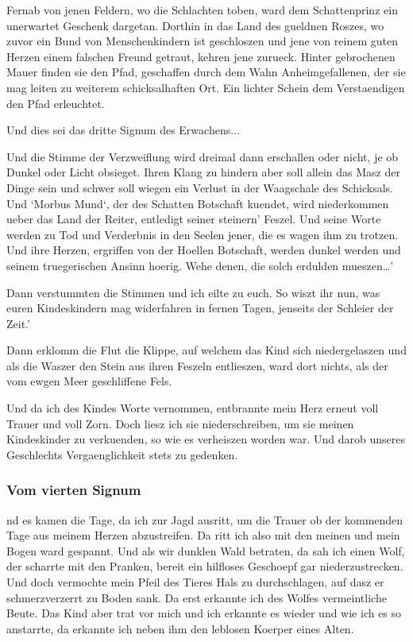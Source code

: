 \documentclass[a5paper,8pt]{book}
\begin{document}
Fernab von jenen Feldern, wo die Schlachten toben, ward dem Schattenprinz ein unerwartet Geschenk dargetan. Dorthin in das Land des gueldnen Roszes, wo zuvor ein Bund von Menschenkindern ist geschloszen und jene von reinem guten Herzen einem falschen Freund getraut, kehren jene zurueck. Hinter gebrochenen Mauer finden sie den Pfad, geschaffen durch dem Wahn Anheimgefallenen, der sie mag leiten zu weiterem schicksalhaften Ort. Ein lichter Schein dem Verstaendigen den Pfad erleuchtet.

Und dies sei das dritte Signum des Erwachens...

Und die Stimme der Verzweiflung wird dreimal dann erschallen oder nicht, je ob Dunkel oder Licht obsieget. Ihren Klang zu hindern aber soll allein das Masz der Dinge sein und schwer soll wiegen ein Verlust in der Waagschale des Schicksals.
Und ‘Morbus Mund‘, der des Schatten Botschaft kuendet, wird niederkommen ueber das Land der Reiter, entledigt seiner steinern’ Feszel. Und seine Worte werden zu Tod und Verderbnis in den Seelen jener, die es wagen ihm zu trotzen. Und ihre Herzen, ergriffen von der Hoellen Botschaft, werden dunkel werden und seinem truegerischen Ansinn hoerig. Wehe denen, die solch erdulden mueszen…’

Dann verstummten die Stimmen und ich eilte zu euch. So wiszt ihr nun, was euren Kindeskindern mag widerfahren in fernen Tagen, jenseits der Schleier der Zeit.’ 

Dann erklomm die Flut die Klippe, auf welchem das Kind sich niedergelaszen und als die Waszer den Stein aus ihren Feszeln entlieszen, ward dort nichts, als der vom ewgen Meer geschliffene Fels.

Und da ich des Kindes Worte vernommen, entbrannte mein Herz erneut voll Trauer und voll Zorn. Doch liesz ich sie niederschreiben, um sie meinen Kindeskinder zu verkuenden, so wie es verheiszen worden war. Und darob unseres Geschlechts Vergaenglichkeit stets zu gedenken. 

\newpage

\subsubsection{ Vom vierten Signum}

nd es kamen die Tage, da ich zur Jagd ausritt, um die Trauer ob der kommenden Tage aus meinem Herzen abzustreifen. Da ritt ich also mit den meinen und mein Bogen ward gespannt. Und als wir dunklen Wald betraten, da sah ich einen Wolf, der scharrte mit den Pranken, bereit ein hilfloses Geschoepf gar niederzustrecken. Und doch vermochte mein Pfeil des Tieres Hals zu durchschlagen, auf dasz er schmerzverzerrt zu Boden sank. Da erst erkannte ich des Wolfes vermeintliche Beute. Das Kind aber trat vor mich und ich erkannte es wieder und wie ich es so anstarrte, da erkannte ich neben ihm den leblosen Koerper eines Alten.
\end{document}
